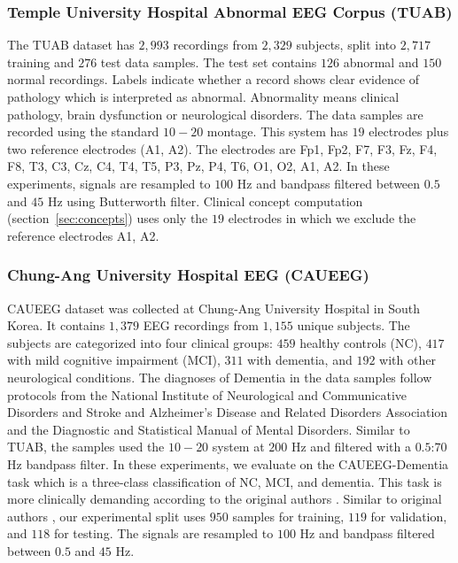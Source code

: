\documentclass[journal,twoside,web]{ieeecolor}
\begin{document}
\subsubsection{Temple University Hospital Abnormal EEG Corpus (TUAB)}
\hfill \break
The TUAB dataset \cite{obeid2016} has $2,993$ recordings from $2,329$ subjects, split into $2,717$ training and $276$ test data samples. The test set contains $126$ abnormal and $150$ normal recordings. Labels indicate whether a record shows clear evidence of pathology which is interpreted as abnormal. Abnormality means clinical pathology, brain dysfunction or neurological disorders. The data samples are recorded using the standard $10-20$ montage. This system has $19$ electrodes plus two reference electrodes (A1, A2). The electrodes are Fp1, Fp2, F7, F3, Fz, F4, F8, T3, C3, Cz, C4, T4, T5, P3, Pz, P4, T6, O1, O2, A1, A2. In these experiments, signals are resampled to $100$ Hz and bandpass filtered between $0.5$ and $45$ Hz using Butterworth filter. Clinical concept computation (section~\ref{sec:concepts}) uses only the $19$ electrodes in which we exclude the reference electrodes A1, A2. 


\subsubsection{Chung-Ang University Hospital EEG (CAUEEG)}
\hfill \break
CAUEEG dataset \cite{kim2023caueeg} was collected at Chung-Ang University Hospital in South Korea. It contains $1,379$ EEG recordings from $1,155$ unique subjects. The subjects are categorized into four clinical groups: $459$ healthy controls (NC), $417$ with mild cognitive impairment (MCI), $311$ with dementia, and $192$ with other neurological conditions. The diagnoses of Dementia in the data samples follow protocols from the National Institute of Neurological and Communicative Disorders and Stroke and Alzheimer’s Disease and Related Disorders Association and the Diagnostic and Statistical Manual of Mental Disorders. Similar to TUAB, the samples used the $10-20$ system at $200$ Hz and filtered with a $0.5$:$70$ Hz bandpass filter. In these experiments, we evaluate on the CAUEEG-Dementia task which is a three-class classification of NC, MCI, and dementia. This task is more clinically demanding according to the original authors \cite{kim2023caueeg}. Similar to original authors \cite{kim2023caueeg}, our experimental split uses $950$ samples for training, $119$ for validation, and $118$ for testing. The signals are resampled to $100$ Hz and bandpass filtered between $0.5$ and $45$ Hz.
\end{document}

